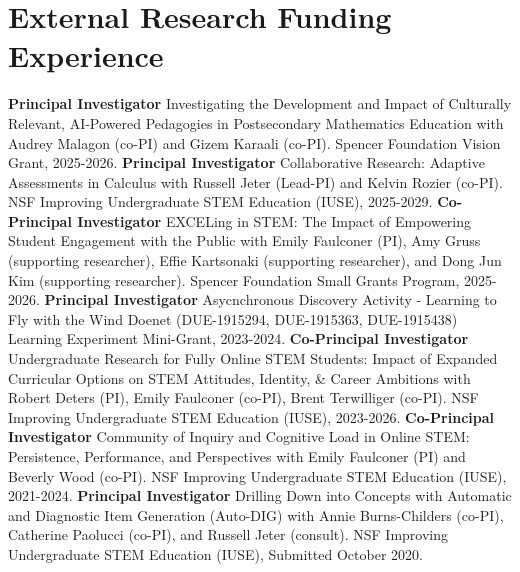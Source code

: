 \documentclass[10pt,a4paper,sans]{moderncv}
\begin{document}
	\section{External Research Funding Experience}
	{\textbf{Principal Investigator}}
	{Investigating the Development and Impact of Culturally Relevant, AI-Powered Pedagogies in Postsecondary Mathematics Education}
	{with Audrey Malagon (co-PI) and Gizem Karaali (co-PI). 
		Spencer Foundation Vision Grant, 2025-2026.}
	{}{}
	{\textbf{Principal Investigator}}
	{Collaborative Research: Adaptive Assessments in Calculus}
	{with Russell Jeter (Lead-PI) and Kelvin Rozier (co-PI). 
		NSF Improving Undergraduate STEM Education (IUSE), 2025-2029.}
	{}{}
	{\textbf{Co-Principal Investigator}}
	{EXCELing in STEM: The Impact of Empowering Student Engagement with the Public}
	{with Emily Faulconer (PI), Amy Gruss (supporting researcher), Effie Kartsonaki (supporting researcher), and Dong Jun Kim (supporting researcher). 
		Spencer Foundation Small Grants Program, 2025-2026.}
	{}{}
	{\textbf{Principal Investigator}}
	{Asycnchronous Discovery Activity - Learning to Fly with the Wind}
	{Doenet (DUE-1915294, DUE-1915363, DUE-1915438) Learning Experiment Mini-Grant, 2023-2024.}
	{}{}
	{\textbf{Co-Principal Investigator}}
	{Undergraduate Research for Fully Online STEM Students: Impact of Expanded Curricular Options on STEM Attitudes, Identity, \& Career Ambitions}
	{with Robert Deters (PI), Emily Faulconer (co-PI), Brent Terwilliger (co-PI). NSF Improving Undergraduate STEM Education (IUSE), 2023-2026.}
	{}{}
	{\textbf{Co-Principal Investigator}}
	{Community of Inquiry and Cognitive Load in Online STEM: Persistence, Performance, and Perspectives}
	{with Emily Faulconer (PI) and Beverly Wood (co-PI). NSF Improving Undergraduate STEM Education (IUSE), 2021-2024.}
	{}{}
	{\textbf{Principal Investigator}}
	{Drilling Down into Concepts with Automatic and Diagnostic Item Generation (Auto-DIG)}
	{with Annie Burns-Childers (co-PI), Catherine Paolucci (co-PI), and Russell Jeter (consult). NSF Improving Undergraduate STEM Education (IUSE), Submitted October 2020.}
\end{document}

